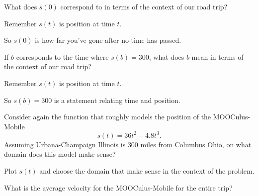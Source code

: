 \documentclass{ximera}
\begin{document}
\begin{question}
What does $s(0)$ correspond to in terms of the context of our road
trip?
\begin{hint}
Remember $s(t)$ is position at time $t$.
\end{hint}
\begin{hint}
So $s(0)$ is how far you've gone after no time has passed. 
\end{hint}
\begin{multipleChoice}
\end{multipleChoice}
\end{question}

\begin{question}
If $b$ corresponds to the time where $s(b) = 300$, what does $b$ mean
in terms of the context of our road trip?
\begin{hint}
Remember $s(t)$ is position at time $t$.
\end{hint}
\begin{hint}
So $s(b)=300$ is a statement relating time and position.  
\end{hint}
\begin{multipleChoice}
\end{multipleChoice}
\end{question}


\begin{question}
Consider again the function that roughly models the position of the
MOOCulus-Mobile
\[
s(t) = 36t^2 -4.8t^3.
\]
Assuming Urbana-Champaign Illinois is $300$ miles from Columbus Ohio,
on what domain does this model make sense?
\begin{hint}
  Plot $s(t)$ and choose the domain that make sense in the context of
  the problem.
\end{hint}
\end{question}

\begin{question}
What is the average velocity for the MOOCulus-Mobile for the entire trip? 
\end{question}
\end{document}
